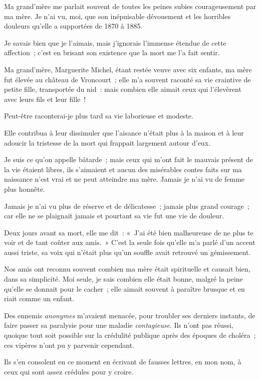 \documentclass[french,twoside]{book} %
\begin{document}
Ma grand’mère me parlait souvent de toutes les peines subies courageusement par ma mère. Je n’ai vu, moi, que son inépuisable dévouement et les horribles douleurs qu’elle a supportées de 1870 à 1885.\par
Je savais bien que je l’aimais, mais j’ignorais l’immense étendue de cette affection ; c’est en brisant son existence que la mort me l’a fait sentir.\par
Ma grand’mère, Marguerite Michel, étant restée veuve avec six enfants, ma mère fut élevée au château de Vroncourt ; elle m’a souvent raconté sa vie craintive de petite fille, transportée du nid : mais combien elle aimait ceux qui l’élevèrent avec leurs fils et leur fille !\par
Peut-être raconterai-je plus tard sa vie laborieuse et modeste.\par
Elle contribua à leur dissimuler que l’aisance  n’était plus à la maison et à leur adoucir la tristesse de la mort qui frappait largement autour d’eux.\par
Je suis ce qu’on appelle bâtarde ; mais ceux qui m’ont fait le mauvais présent de la vie étaient libres, ils s’aimaient et aucun des misérables contes faits sur ma naissance n’est vrai et ne peut atteindre ma mère. Jamais je n’ai vu de femme plus honnête.\par
Jamais je n’ai vu plus de réserve et de délicatesse ; jamais plus grand courage ; car elle ne se plaignait jamais et pourtant sa vie fut une vie de douleur.\par
Deux jours avant sa mort, elle me dit : « J’ai été bien malheureuse de ne plus te voir et de tant coûter aux amis. » C’est la seule fois qu’elle m’a parlé d’un accent aussi triste, sa voix qui n’était plus qu’un souffle avait retrouvé un gémissement.\par
Nos amis ont reconnu souvent combien ma mère était spirituelle et causait bien, dans sa simplicité. Moi seule, je sais combien elle était bonne, malgré la peine qu’elle se donnait pour le cacher ; elle aimait souvent à paraître brusque et en riait comme un enfant.\par
Des ennemis \emph{anonymes} m’avaient menacée, pour troubler ses derniers instants, de faire passer  sa paralysie pour une maladie \emph{contagieuse}. Ils n’ont pas réussi, quoique tout soit possible sur la crédulité publique après des époques de choléra ; ces vipères n’ont pu y parvenir cependant.\par
Ils s’en consolent en ce moment en écrivant de fausses lettres, en mon nom, à ceux qui sont assez crédules pour y croire.\par
\end{document}
